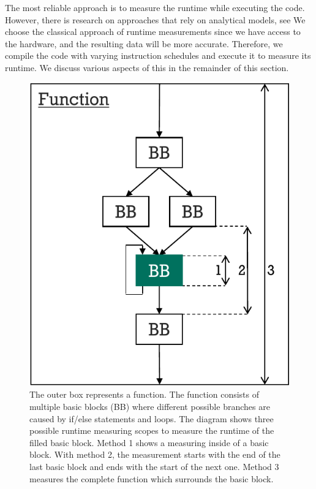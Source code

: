 The most reliable approach is to measure the runtime while executing the code.
However, there is research on approaches that rely on analytical models, see  %
We choose the classical approach of runtime measurements since we have access to the hardware, and the resulting data will be more accurate.
Therefore, we compile the code with varying instruction schedules and execute it to measure its runtime.
We discuss various aspects of this in the remainder of this section.

\begin{figure}
    \centering
    \includegraphics[scale=0.8]{img/ppt/runtime_measurement_scopes-crop.pdf}
    \caption[Possibile Scopes for Measuring Runtimes]{The outer box represents a function. 
    The function consists of multiple basic blocks (BB) where different possible branches are caused by if/else statements and loops. 
    The diagram shows three possible runtime measuring scopes to measure the runtime of the filled basic block.
    Method 1 shows a measuring inside of a basic block. 
    With method 2, the measurement starts with the end of the last basic block and ends with the start of the next one.
    Method 3 measures the complete function which surrounds the basic block.}
    \label{fig:approach:runtime_scopes}
\end{figure}

